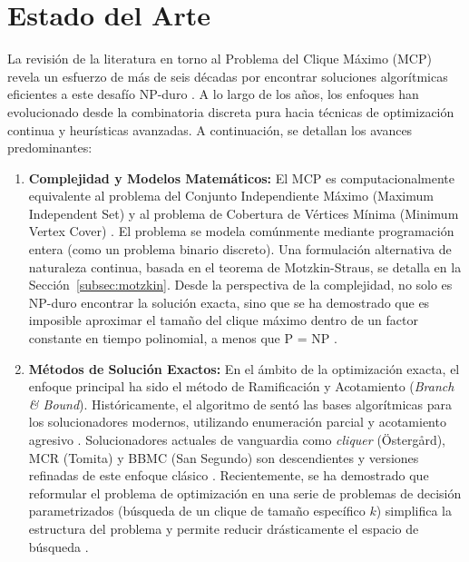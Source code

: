 \section{Estado del Arte}\label{sec:eda}

La revisión de la literatura en torno al Problema del Clique Máximo (MCP) revela un esfuerzo de más de seis décadas por encontrar soluciones algorítmicas eficientes a este desafío NP-duro \parencite{bomze1999, pardalos1994maximum}. A lo largo de los años, los enfoques han evolucionado desde la combinatoria discreta pura hacia técnicas de optimización continua y heurísticas avanzadas. A continuación, se detallan los avances predominantes:

\begin{enumerate}
    \item \textbf{Complejidad y Modelos Matemáticos:} El MCP es computacionalmente equivalente al problema del Conjunto Independiente Máximo (Maximum Independent Set) y al problema de Cobertura de Vértices Mínima (Minimum Vertex Cover) \parencite{pardalos1994maximum}. El problema se modela comúnmente mediante programación entera (como un problema binario discreto). Una formulación alternativa de naturaleza continua, basada en el teorema de Motzkin-Straus, se detalla en la Sección~\ref{subsec:motzkin}. Desde la perspectiva de la complejidad, no solo es NP-duro encontrar la solución exacta, sino que se ha demostrado que es imposible aproximar el tamaño del clique máximo dentro de un factor constante en tiempo polinomial, a menos que P = NP \parencite{pardalos1994maximum}.
    
    \item \textbf{Métodos de Solución Exactos:} En el ámbito de la optimización exacta, el enfoque principal ha sido el método de Ramificación y Acotamiento (\textit{Branch \& Bound}). Históricamente, el algoritmo de \textcite{carraghan1990} sentó las bases algorítmicas para los solucionadores modernos, utilizando enumeración parcial y acotamiento agresivo \parencite{szabo2018_different}. Solucionadores actuales de vanguardia como \textit{cliquer} (Östergård), MCR (Tomita) y BBMC (San Segundo) son descendientes y versiones refinadas de este enfoque clásico \parencite{szabo2018_different}. Recientemente, se ha demostrado que reformular el problema de optimización en una serie de problemas de decisión parametrizados (búsqueda de un clique de tamaño específico $k$) simplifica la estructura del problema y permite reducir drásticamente el espacio de búsqueda \parencite{szabo2018_different}.
    

\end{enumerate}
